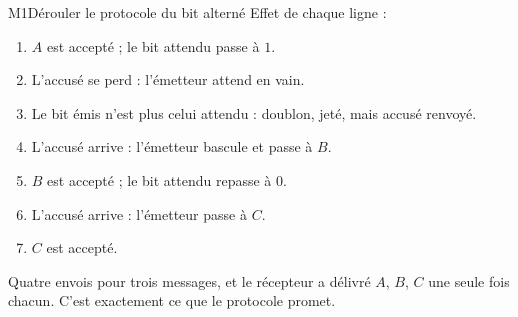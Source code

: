 \begin{fichemethode}{M1}{Dérouler le protocole du bit alterné}
\medskip
Effet de chaque ligne :

\begin{enumerate}
  \item $A$ est accepté ; le bit attendu passe à $1$.
  \item L'accusé se perd : l'émetteur attend en vain.
  \item Le bit émis n'est plus celui attendu : doublon, jeté, mais accusé renvoyé.
  \item L'accusé arrive : l'émetteur bascule et passe à $B$.
  \item $B$ est accepté ; le bit attendu repasse à $0$.
  \item L'accusé arrive : l'émetteur passe à $C$.
  \item $C$ est accepté.
\end{enumerate}

Quatre envois pour trois messages, et le récepteur a délivré $A$, $B$, $C$ une seule fois
chacun. C'est exactement ce que le protocole promet.



\end{fichemethode}
